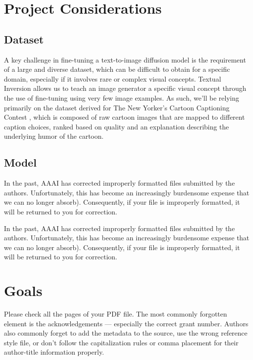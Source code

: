 \documentclass[letterpaper]{article} %
\begin{document}
\section{Project Considerations}

\subsection{Dataset}
A key challenge in fine-tuning a text-to-image diffusion model is the requirement of a large and diverse dataset, which can be difficult to obtain for a specific domain, especially if it involves rare or complex visual concepts. Textual Inversion allows us to teach an image generator a specific visual concept through the use of fine-tuning using very few image examples. As such, we’ll be relying primarily on the dataset derived for The New Yorker’s Cartoon Captioning Contest \cite{hessel2022androids}, which is composed of raw cartoon images that are mapped to different caption choices, ranked based on quality and an explanation describing the underlying humor of the cartoon.

\subsection{Model}

In the past, AAAI has corrected improperly formatted files submitted by the authors. Unfortunately, this has become an increasingly burdensome expense that we can no longer absorb). Consequently, if your file is improperly formatted, it will be returned to you for correction.

In the past, AAAI has corrected improperly formatted files submitted by the authors. Unfortunately, this has become an increasingly burdensome expense that we can no longer absorb). Consequently, if your file is improperly formatted, it will be returned to you for correction.

\section{Goals}
Please check all the pages of your PDF file. The most commonly forgotten element is the acknowledgements --- especially the correct grant number. Authors also commonly forget to add the metadata to the source, use the wrong reference style file, or don't follow the capitalization rules or comma placement for their author-title information properly.


\end{document}
